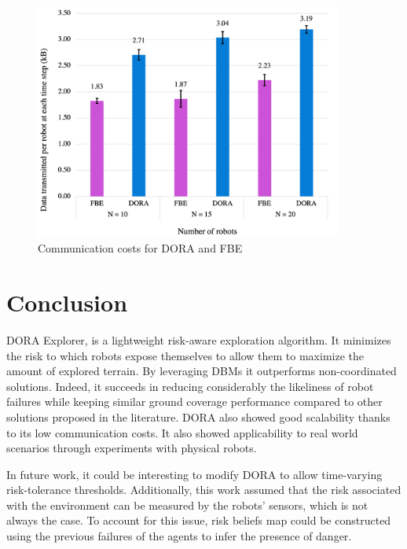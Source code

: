 \begin{figure}[htbp]
    \centering
    \includegraphics[width=0.9\textwidth]{figures/dora_explorer/communication.png}
    \caption[DORA communication costs]{Communication costs for \ac{DORA} and \ac{FBE}}
    \label{results:communicationCosts}
\end{figure}

\FloatBarrier

\section{Conclusion}
\ac{DORA} Explorer, is a lightweight risk-aware exploration algorithm. It minimizes the risk to which robots expose themselves to allow them to maximize the amount of explored terrain. By leveraging \ac{DBM}s it outperforms non-coordinated solutions. Indeed, it succeeds in reducing considerably the likeliness of robot failures while keeping similar ground coverage performance compared to other solutions proposed in the literature. \ac{DORA} also showed good scalability thanks to its low communication costs. It also showed applicability to real world scenarios through experiments with physical robots.

In future work, it could be interesting to modify \ac{DORA} to allow time-varying risk-tolerance thresholds. Additionally, this work assumed that the risk associated with the environment can be measured by the robots' sensors, which is not always the case. To account for this issue, risk beliefs map could be constructed using the previous failures of the agents to infer the presence of danger.
